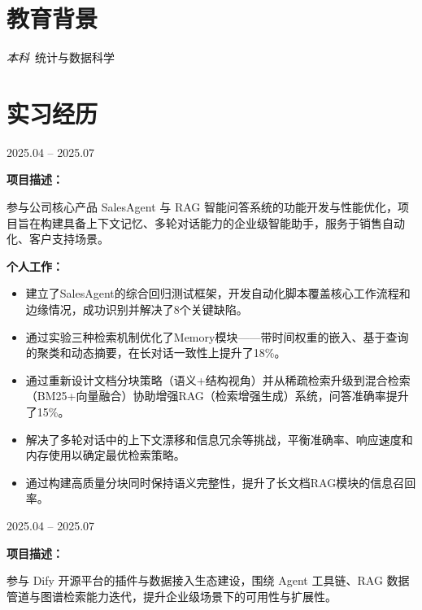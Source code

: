 \documentclass{resume}
\begin{document}



\vspace{-2ex}
\section{教育背景}
\textit{本科}\ 统计与数据科学

\vspace{-1.8ex}
\section{实习经历}
 {2025.04 -- 2025.07}

\textbf{项目描述：}

参与公司核心产品 SalesAgent 与 RAG 智能问答系统的功能开发与性能优化，项目旨在构建具备上下文记忆、多轮对话能力的企业级智能助手，服务于销售自动化、客户支持场景。

\textbf{个人工作：}
\begin{itemize}
    \item 建立了SalesAgent的综合回归测试框架，开发自动化脚本覆盖核心工作流程和边缘情况，成功识别并解决了8个关键缺陷。
    \item 通过实验三种检索机制优化了Memory模块——带时间权重的嵌入、基于查询的聚类和动态摘要，在长对话一致性上提升了18\%。
    \item 通过重新设计文档分块策略（语义+结构视角）并从稀疏检索升级到混合检索（BM25+向量融合）协助增强RAG（检索增强生成）系统，问答准确率提升了15\%。
    \item 解决了多轮对话中的上下文漂移和信息冗余等挑战，平衡准确率、响应速度和内存使用以确定最优检索策略。

    \item 通过构建高质量分块同时保持语义完整性，提升了长文档RAG模块的信息召回率。

\end{itemize}

 {2025.04 -- 2025.07}

\textbf{项目描述：}

参与 Dify 开源平台的插件与数据接入生态建设，围绕 Agent 工具链、RAG 数据管道与图谱检索能力迭代，提升企业级场景下的可用性与扩展性。
\end{document}
